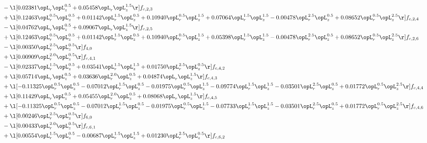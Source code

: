 \begin{alignat}{2}
& - \l[  0.02381 \opL_r \opL_z^{0.5} +  0.05458 \opL_r \opL_z^{1.5}  \r] f_{c,2,3} \nonumber \\ 
& + \l[  0.12463 \opL_r^{0.5} \opL_z^{0.5} +  0.01142 \opL_r^{1.5} \opL_z^{0.5} +  0.10940 \opL_r^{0.5} \opL_z^{1.5} +  0.07064 \opL_r^{1.5} \opL_z^{1.5}   -0.00478 \opL_r^{2.5} \opL_z^{0.5} +  0.08652 \opL_r^{0.5} \opL_z^{2.5}  \r] f_{c,2,4} \nonumber \\ 
& - \l[  0.04762 \opL_r \opL_z^{0.5} +  0.09067 \opL_r \opL_z^{1.5}  \r] f_{c,2,5} \nonumber \\ 
& + \l[  0.12463 \opL_r^{0.5} \opL_z^{0.5} +  0.01142 \opL_r^{1.5} \opL_z^{0.5} +  0.10940 \opL_r^{0.5} \opL_z^{1.5} +  0.05398 \opL_r^{1.5} \opL_z^{1.5}   -0.00478 \opL_r^{2.5} \opL_z^{0.5} +  0.08652 \opL_r^{0.5} \opL_z^{2.5}  \r] f_{c,2,6} \nonumber \\ 
& - \l[  0.00350 \opL_r^{2.5} \opL_z^{0.5}  \r] f_{4,0} \nonumber \\ 
& + \l[  0.00909 \opL_r^{2.0} \opL_z^{0.5}  \r] f_{c,4,1} \nonumber \\ 
& - \l[  0.02337 \opL_r^{1.5} \opL_z^{0.5} +  0.03541 \opL_r^{1.5} \opL_z^{1.5} +  0.01750 \opL_r^{2.5} \opL_z^{0.5}  \r] f_{c,4,2} \nonumber \\ 
& + \l[  0.05714 \opL_r \opL_z^{0.5} +  0.03636 \opL_r^{2.0} \opL_z^{0.5} +  0.04874 \opL_r \opL_z^{1.5}  \r] f_{c,4,3} \nonumber \\ 
& + \l[  -0.11325 \opL_r^{0.5} \opL_z^{0.5}   -0.07012 \opL_r^{1.5} \opL_z^{0.5}   -0.01975 \opL_r^{0.5} \opL_z^{1.5}   -0.09774 \opL_r^{1.5} \opL_z^{1.5}   -0.03501 \opL_r^{2.5} \opL_z^{0.5} +  0.01772 \opL_r^{0.5} \opL_z^{2.5}  \r] f_{c,4,4} \nonumber \\ 
& + \l[  0.11429 \opL_r \opL_z^{0.5} +  0.05455 \opL_r^{2.0} \opL_z^{0.5} +  0.08068 \opL_r \opL_z^{1.5}  \r] f_{c,4,5} \nonumber \\ 
& + \l[  -0.11325 \opL_r^{0.5} \opL_z^{0.5}   -0.07012 \opL_r^{1.5} \opL_z^{0.5}   -0.01975 \opL_r^{0.5} \opL_z^{1.5}   -0.07733 \opL_r^{1.5} \opL_z^{1.5}   -0.03501 \opL_r^{2.5} \opL_z^{0.5} +  0.01772 \opL_r^{0.5} \opL_z^{2.5}  \r] f_{c,4,6} \nonumber \\ 
& + \l[  0.00246 \opL_r^{2.5} \opL_z^{0.5}  \r] f_{6,0} \nonumber \\ 
& - \l[  0.00433 \opL_r^{2.0} \opL_z^{0.5}  \r] f_{c,6,1} \nonumber \\ 
& + \l[  0.00554 \opL_r^{1.5} \opL_z^{0.5}   -0.00687 \opL_r^{1.5} \opL_z^{1.5} +  0.01230 \opL_r^{2.5} \opL_z^{0.5}  \r] f_{c,6,2} \nonumber \\ 

\end{alignat}
